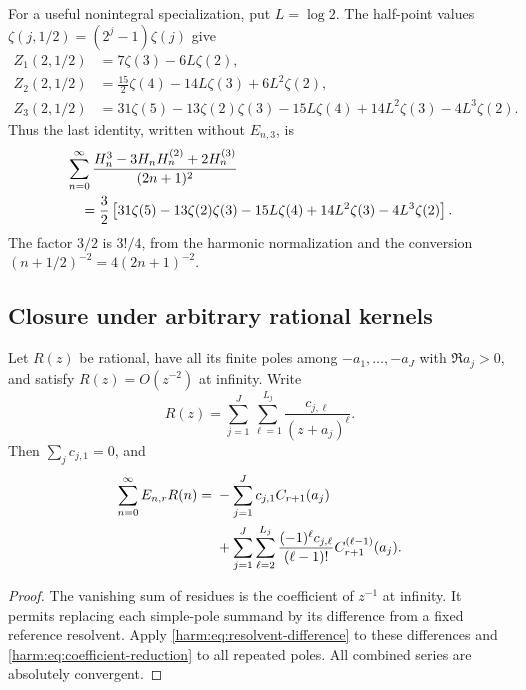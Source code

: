 For a useful nonintegral specialization, put $L=\log2$.  The half-point
values $\zeta(j,1/2)=(2^j-1)\zeta(j)$ give
\begin{align}
 Z_1(2,1/2)&=7\zeta(3)-6L\zeta(2),\\
 Z_2(2,1/2)&=\frac{15}{2}\zeta(4)-14L\zeta(3)+6L^2\zeta(2),\\
 Z_3(2,1/2)&=31\zeta(5)-13\zeta(2)\zeta(3)-15L\zeta(4)
                       +14L^2\zeta(3)-4L^3\zeta(2).
 \label{harm:eq:half-examples}
\end{align}
Thus the last identity, written without $E_{n,3}$, is
\begin{align}
 &\sum_{n=0}^{\infty}
 \frac{H_n^3-3H_nH_n^{(2)}+2H_n^{(3)}}{(2n+1)^2}\notag\\
 &\quad=\frac32\left[
 31\zeta(5)-13\zeta(2)\zeta(3)-15L\zeta(4)
 +14L^2\zeta(3)-4L^3\zeta(2)\right].
 \label{harm:eq:half-cubic-unpacked}
\end{align}
The factor $3/2$ is $3!/4$, from the harmonic normalization and the
conversion $(n+1/2)^{-2}=4(2n+1)^{-2}$.

\subsection{Closure under arbitrary rational kernels}

\begin{corollary}\label{harm:cor:rational}
Let $R(z)$ be rational, have all its finite poles among $-a_1,\ldots,-a_J$
with $\Re a_j>0$, and satisfy $R(z)=O(z^{-2})$ at infinity.  Write
\[
 R(z)=\sum_{j=1}^{J}\sum_{\ell=1}^{L_j}
              \frac{c_{j,\ell}}{(z+a_j)^\ell}.
\]
Then $\sum_jc_{j,1}=0$, and
\begin{align}\label{harm:eq:rational-compiler}
 \sum_{n=0}^{\infty}E_{n,r}R(n)
 ={}&-\sum_{j=1}^{J}c_{j,1}C_{r+1}(a_j)\notag\\
 &+\sum_{j=1}^{J}\sum_{\ell=2}^{L_j}
 \frac{(-1)^\ell c_{j,\ell}}{(\ell-1)!}
           C_{r+1}^{(\ell-1)}(a_j).
\end{align}
\end{corollary}
\begin{proof}
The vanishing sum of residues is the coefficient of $z^{-1}$ at infinity.
It permits replacing each simple-pole summand by its difference from a
fixed reference resolvent.  Apply \eqref{harm:eq:resolvent-difference} to
these differences and \eqref{harm:eq:coefficient-reduction} to all repeated
poles.  All combined series are absolutely convergent.
\end{proof}

